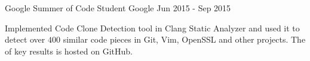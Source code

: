 \begin{cventries}
  \cventry
    {Google Summer of Code Student}
    {Google}
    {}
    {Jun 2015 - Sep 2015}
    {
      \begin{cvitems}
        Implemented Code Clone Detection tool in Clang Static Analyzer and used
        it to detect over $400$ similar code pieces in Git, Vim, OpenSSL and
        other projects. The
        of key results is hosted on GitHub.
      \end{cvitems}
    }

\end{cventries}
